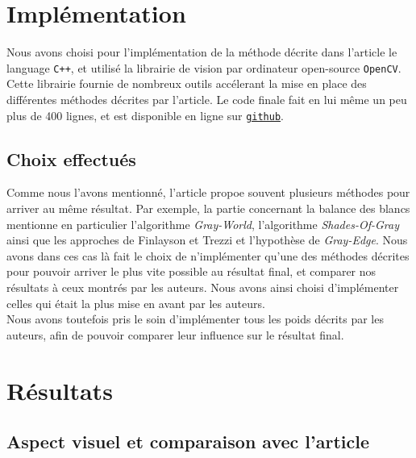 \documentclass[twoside]{article}
\begin{document}
\section{Implémentation}
Nous avons choisi pour l'implémentation de la méthode décrite dans l'article le language \texttt{C++}, et utilisé la librairie de vision par ordinateur open-source \texttt{OpenCV}. Cette librairie fournie de nombreux outils accélerant la mise en place des différentes méthodes décrites par l'article. Le code finale fait en lui même un peu plus de 400 lignes, et est disponible en ligne sur \texttt{\href{http://github.com/jcaille/Submarine}{github}}.

\subsection{Choix effectués}
Comme nous l'avons mentionné, l'article propoe souvent plusieurs méthodes pour arriver au même résultat. Par exemple, la partie concernant la balance des blancs mentionne en particulier l'algorithme \emph{Gray-World}, l'algorithme \emph{Shades-Of-Gray} ainsi que les approches de Finlayson et Trezzi et l'hypothèse de \emph{Gray-Edge}. Nous avons dans ces cas là fait le choix de n'implémenter qu'une des méthodes décrites pour pouvoir arriver le plus vite possible au résultat final, et comparer nos résultats à ceux montrés par les auteurs. Nous avons ainsi choisi d'implémenter celles qui était la plus mise en avant par les auteurs.\\
Nous avons toutefois pris le soin d'implémenter tous les poids décrits par les auteurs, afin de pouvoir comparer leur influence sur le résultat final.

\section{Résultats}
\subsection{Aspect visuel et comparaison avec l'article}
\end{document}
